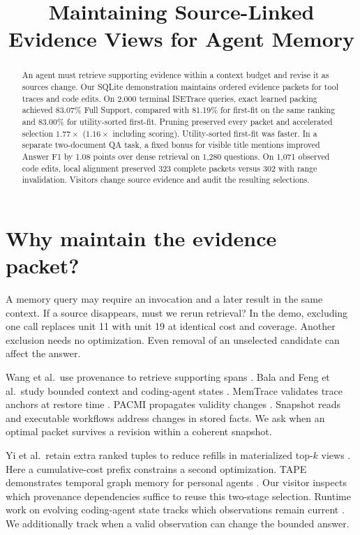 \documentclass[conference]{IEEEtran}
\title{Maintaining Source-Linked Evidence Views for Agent Memory}
\author{\IEEEauthorblockN{Anonymous authors}}
\begin{document}
\maketitle
\begin{abstract}
An agent must retrieve supporting evidence within a context budget and revise it as sources change. Our SQLite demonstration maintains ordered evidence packets for tool traces and code edits. On 2,000 terminal ISETrace queries, exact learned packing achieved 83.07\% Full Support, compared with 81.19\% for first-fit on the same ranking and 83.00\% for utility-sorted first-fit. Pruning preserved every packet and accelerated selection $1.77\times$ ($1.16\times$ including scoring). Utility-sorted first-fit was faster. In a separate two-document QA task, a fixed bonus for visible title mentions improved Answer F1 by 1.08 points over dense retrieval on 1,280 questions. On 1,071 observed code edits, local alignment preserved 323 complete packets versus 302 with range invalidation. Visitors change source evidence and audit the resulting selections.

\end{abstract}

\section{Why maintain the evidence packet?}

A memory query may require an invocation and a later result in the same context. If a source disappears, must we rerun retrieval? In the demo, excluding one call replaces unit 11 with unit 19 at identical cost and coverage. Another exclusion needs no optimization. Even removal of an unselected candidate can affect the answer.

Wang et al.\ use provenance to retrieve supporting spans \cite{wang}. Bala and Feng et al.\ study bounded context and coding-agent states \cite{bala,feng}. MemTrace validates trace anchors at restore time \cite{memtrace}. PACMI propagates validity changes \cite{pacmi}. Snapshot reads \cite{readboundaries} and executable workflows \cite{changes} address changes in stored facts. We ask when an optimal packet survives a revision within a coherent snapshot.

Yi et al.\ retain extra ranked tuples to reduce refills in materialized top-$k$ views \cite{topk}. Here a cumulative-cost prefix constrains a second optimization. TAPE demonstrates temporal graph memory for personal agents \cite{tape}. Our visitor inspects which provenance dependencies suffice to reuse this two-stage selection. Runtime work on evolving coding-agent state tracks which observations remain current \cite{execledger}. We additionally track when a valid observation can change the bounded answer.
\end{document}
